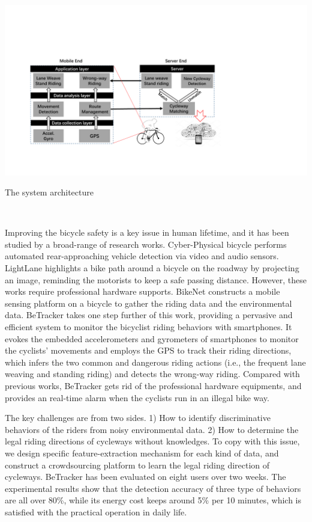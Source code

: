 \documentclass{sigchi-ext}
\def\sysname{BeTracker }
\def\ie{i.e., }
\begin{document}
\begin{marginfigure}[1pc]
	\begin{turn}{90}
		\begin{minipage}{2\marginparwidth}
			\centering
			\includegraphics[width=1.95\marginparwidth]{figures/sys.pdf}
			\caption{The system architecture } ~\label{fig:sys}
		\end{minipage}
	\end{turn}
\end{marginfigure}

Improving the bicycle safety is a key issue in human lifetime, and it has been studied by a broad-range of research works. Cyber-Physical bicycle \cite{Bib:imp2010} performs automated rear-approaching vehicle detection via video and audio sensors. LightLane \cite{bib:Lig2014} highlights a bike path around a bicycle on the roadway by projecting an image, reminding the motorists to keep a safe passing distance. However, these works require professional hardware supports.  BikeNet \cite{Bib:Bik2009} constructs a mobile sensing platform on a bicycle to gather the riding data and the environmental data. \sysname takes one step further of this work,  providing a pervasive and efficient system to monitor the bicyclist riding behaviors with smartphones. It evokes the embedded accelerometers and gyrometers of smartphones to monitor the cyclists' movements and employs the GPS to track their riding directions, which infers the two common and dangerous riding actions (\ie the frequent lane weaving and standing riding) and detects the wrong-way riding.  
Compared with previous works, \sysname gets rid of the professional hardware equipments, and provides an real-time alarm when the cyclists run in an illegal bike way. 

The key challenges are from two sides. 1) How to identify discriminative behaviors of the riders from noisy environmental data. 2) How to determine the legal riding directions of cycleways without knowledges.   
To copy with this issue, we design specific feature-extraction mechanism for each kind of data, and construct a crowdsourcing platform to learn the legal riding direction of cycleways. 
\sysname has been evaluated on eight users over two weeks. The experimental results show that the detection accuracy of three type of behaviors are all over 80\%, while its energy cost keeps around 5\% per 10 minutes, which is satisfied with the practical operation in daily life.  
\end{document}
